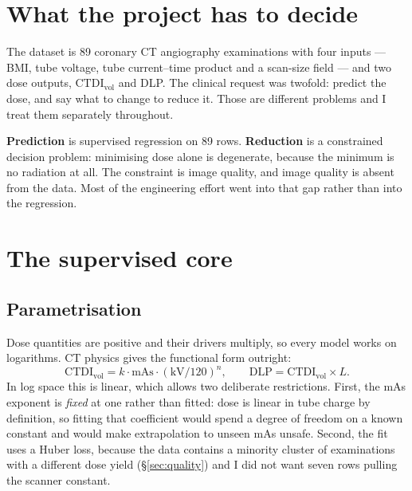 \documentclass[10pt,a4paper,twocolumn]{article}
\newcommand{\ctdi}{\ensuremath{\mathrm{CTDI}_{\mathrm{vol}}}}
\begin{document}

\section{What the project has to decide}

The dataset is 89 coronary CT angiography examinations with four inputs — BMI, tube voltage, tube
current--time product and a scan-size field — and two dose outputs, \ctdi{} and DLP. The clinical request was
twofold: predict the dose, and say what to change to reduce it. Those are different problems and I treat them
separately throughout.

\textbf{Prediction} is supervised regression on 89 rows. \textbf{Reduction} is a constrained decision problem:
minimising dose alone is degenerate, because the minimum is no radiation at all. The constraint is image
quality, and image quality is absent from the data. Most of the engineering effort went into that gap rather
than into the regression.

\section{The supervised core}

\subsection{Parametrisation}

Dose quantities are positive and their drivers multiply, so every model works on logarithms. CT physics gives
the functional form outright:
\[
\ctdi = k\cdot \mathrm{mAs}\cdot(\mathrm{kV}/120)^{n},\qquad
\mathrm{DLP} = \ctdi \times L .
\]
In log space this is linear, which allows two deliberate restrictions. First, the mAs exponent is \emph{fixed}
at one rather than fitted: dose is linear in tube charge by definition, so fitting that coefficient would spend
a degree of freedom on a known constant and would make extrapolation to unseen mAs unsafe. Second, the fit uses
a Huber loss, because the data contains a minority cluster of examinations with a different dose yield
(\S\ref{sec:quality}) and I did not want seven rows pulling the scanner constant.
\end{document}
